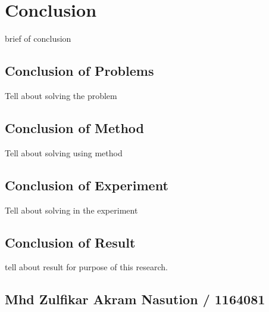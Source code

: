 \chapter{Conclusion}
brief of conclusion

\section{Conclusion of Problems}
Tell about solving the problem

\section{Conclusion of Method}
Tell about solving using method

\section{Conclusion of Experiment}
Tell about solving in the experiment

\section{Conclusion of Result}
tell about result for purpose of this research.

\section{Mhd Zulfikar Akram Nasution / 1164081}
